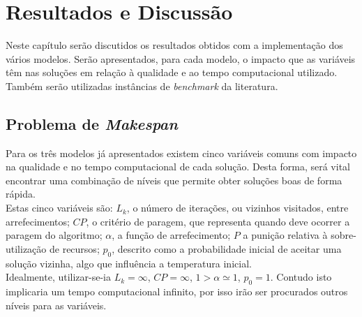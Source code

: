
%


\epigraphfontsize{\small\itshape}
\setlength\epigraphwidth{12.5cm}
\setlength\epigraphrule{0pt}

\chapter{Resultados e Discussão}
\label{cha:resultados}

Neste capítulo serão discutidos os resultados obtidos com a implementação dos vários modelos. Serão apresentados, para cada modelo, o impacto que as variáveis têm nas soluções em relação à qualidade e ao tempo computacional utilizado. Também serão utilizadas instâncias de \textit{benchmark} da literatura.\\

\section{Problema de \textit{Makespan}}

Para os três modelos já apresentados existem cinco variáveis comuns com impacto na qualidade e no tempo computacional de cada solução. Desta forma, será vital encontrar uma combinação de níveis que permite obter soluções boas de forma rápida.\\
Estas cinco variáveis são: $L_{k}$, o número de iterações, ou vizinhos visitados, entre arrefecimentos; $CP$, o critério de paragem, que representa quando deve ocorrer a paragem do algoritmo; $\alpha$, a função de arrefecimento; $P$ a punição relativa à sobre-utilização de recursos; $p_{0}$, descrito como a probabilidade inicial de aceitar uma solução vizinha, algo que influência a temperatura inicial.\\
Idealmente, utilizar-se-ia $L_{k}=\infty$, $CP=\infty$, $1>\alpha\simeq1$, $p_{0}=1$. Contudo isto implicaria um tempo computacional infinito, por isso irão ser procurados outros níveis para as variáveis.\\

